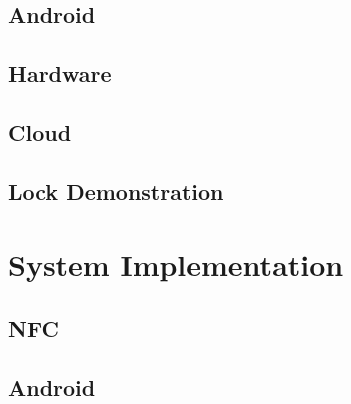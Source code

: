 \documentclass[12pt]{report}
\begin{document}

\section{Android}


\section{Hardware}


\section{Cloud}


\section{Lock Demonstration}


\chapter{System Implementation}


\section{NFC}


\section{Android}

\end{document}
